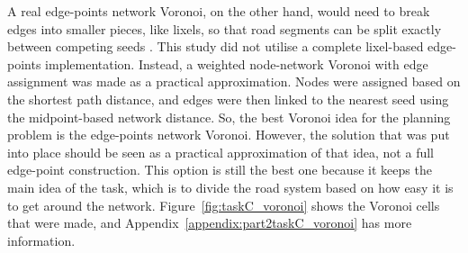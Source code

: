 \documentclass[acmsmall,nonacm,natbib=false]{acmart}
\begin{document}
A real edge-points network Voronoi, on the other hand, would need to break edges into smaller pieces, like lixels, so that road segments can be split exactly between competing seeds \cite{ai2015voronoi}. This study did not utilise a complete lixel-based edge-points implementation. Instead, a weighted node-network Voronoi with edge assignment was made as a practical approximation. Nodes were assigned based on the shortest path distance, and edges were then linked to the nearest seed using the midpoint-based network distance. So, the best Voronoi idea for the planning problem is the edge-points network Voronoi. However, the solution that was put into place should be seen as a practical approximation of that idea, not a full edge-point construction. This option is still the best one because it keeps the main idea of the task, which is to divide the road system based on how easy it is to get around the network. Figure~\ref{fig:taskC_voronoi} shows the Voronoi cells that were made, and Appendix~\ref{appendix:part2taskC_voronoi} has more information.
\end{document}
